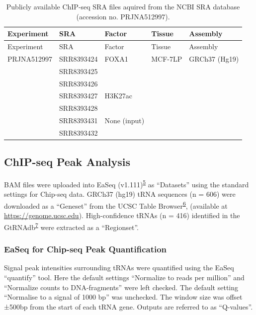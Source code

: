 \documentclass[
  12pt,
]{article}
\begin{document}
\begin{longtable}[]{@{}lllll@{}}
\caption{\label{tab:data}Publicly available ChIP-seq SRA files aquired from the NCBI SRA database (accession no. PRJNA512997).}\tabularnewline
\toprule()
Experiment & SRA & Factor & Tissue & Assembly \\
\midrule()
\endfirsthead
\toprule()
Experiment & SRA & Factor & Tissue & Assembly \\
\midrule()
\endhead
PRJNA512997 & SRR8393424 & FOXA1 & MCF-7LP & GRCh37 (Hg19) \\
& SRR8393425 & & & \\
& SRR8393426 & & & \\
& SRR8393427 & H3K27ac & & \\
& SRR8393428 & & & \\
& SRR8393431 & None (input) & & \\
& SRR8393432 & & & \\
\bottomrule()
\end{longtable}

\hypertarget{chip-seq-peak-analysis}{%
\subsection{ChIP-seq Peak Analysis}\label{chip-seq-peak-analysis}}

BAM files were uploaded into EaSeq (v1.111)\textsuperscript{\protect\hyperlink{ref-lerdrup2016}{5}} as ``Datasets'' using the standard settings for Chip-seq data.
GRCh37 (hg19) tRNA sequences (n = 606) were downloaded as a ``Geneset'' from the UCSC Table Browser\textsuperscript{\protect\hyperlink{ref-Karolchik2004}{6}}, (available at \url{https://genome.ucsc.edu}).
High-confidence tRNAs (n = 416) identified in the GtRNAdb\textsuperscript{\protect\hyperlink{ref-Chan2016}{7}} were extracted as a ``Regionset''.

\hypertarget{easeq-for-chip-seq-peak-quantification}{%
\subsubsection{EaSeq for Chip-seq Peak Quantification}\label{easeq-for-chip-seq-peak-quantification}}

Signal peak intensities surrounding tRNAs were quantified using the EaSeq ``quantify'' tool.
Here the default settings ``Normalize to reads per million'' and ``Normalize counts to DNA-fragments'' were left checked.
The default setting ``Normalise to a signal of 1000 bp'' was unchecked.
The window size was offset ±500bp from the start of each tRNA gene.
Outputs are referred to as ``Q-values''.
\end{document}
